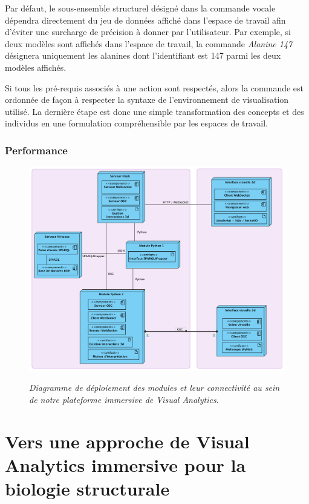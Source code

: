 Par défaut, le sous-ensemble structurel désigné dans la commande vocale dépendra directement du jeu de données affiché dans l'espace de travail afin d'éviter une surcharge de précision à donner par l'utilisateur. Par exemple, si deux modèles sont affichés dans l'espace de travail, la commande \textit{Alanine 147} désignera uniquement les alanines dont l'identifiant est 147 parmi les deux modèles affichés.

Si tous les pré-requis associés à une action sont respectés, alors la commande est ordonnée de façon à respecter la syntaxe de l'environnement de visualisation utilisé. La dernière étape est donc une simple transformation des concepts et des individus en une formulation compréhensible par les espaces de travail.

\subsubsection{Performance}




\begin{figure}
  \centering
  {\includegraphics[width=.75\linewidth]{./figures/ch5/platform_architecture}}
    \caption[Diagramme de déploiement de notre plateforme de \textit{Visual Analytics} immersive.]{{\it Diagramme de déploiement des modules et leur connectivité au sein de notre plateforme immersive de Visual Analytics.}}
  \label{Fig:platform_architecture}
  \hspace{0.3cm}
\end{figure}


\section{Vers une approche de Visual Analytics immersive pour la biologie structurale}

